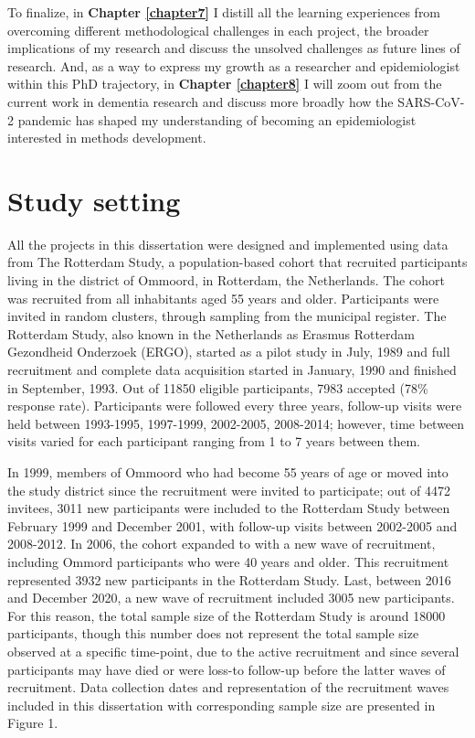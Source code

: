 \documentclass[
]{book}
\begin{document}
To finalize, in \textbf{Chapter \ref{chapter7}} I distill all the learning experiences from overcoming different methodological challenges in each project, the broader implications of my research and discuss the unsolved challenges as future lines of research. And, as a way to express my growth as a researcher and epidemiologist within this PhD trajectory, in \textbf{Chapter \ref{chapter8}} I will zoom out from the current work in dementia research and discuss more broadly how the SARS-CoV-2 pandemic has shaped my understanding of becoming an epidemiologist interested in methods development.

\newpage

\hypertarget{study-setting}{%
\section{Study setting}\label{study-setting}}

All the projects in this dissertation were designed and implemented using data from The Rotterdam Study, a population-based cohort that recruited participants living in the district of Ommoord, in Rotterdam, the Netherlands. The cohort was recruited from all inhabitants aged 55 years and older. Participants were invited in random clusters, through sampling from the municipal register\autocite{hofman1991}. The Rotterdam Study, also known in the Netherlands as Erasmus Rotterdam Gezondheid Onderzoek (ERGO), started as a pilot study in July, 1989 and full recruitment and complete data acquisition started in January, 1990 and finished in September, 1993. Out of 11850 eligible participants, 7983 accepted (78\% response rate). Participants were followed every three years, follow-up visits were held between 1993-1995, 1997-1999, 2002-2005, 2008-2014; however, time between visits varied for each participant ranging from 1 to 7 years between them.

In 1999, members of Ommoord who had become 55 years of age or moved into the study district since the recruitment were invited to participate; out of 4472 invitees, 3011 new participants were included to the Rotterdam Study \autocite{hofman2007} between February 1999 and December 2001, with follow-up visits between 2002-2005 and 2008-2012. In 2006, the cohort expanded to with a new wave of recruitment, including Ommord participants who were 40 years and older. This recruitment represented 3932 new participants in the Rotterdam Study. Last, between 2016 and December 2020, a new wave of recruitment included 3005 new participants. For this reason, the total sample size of the Rotterdam Study is around 18000 participants, though this number does not represent the total sample size observed at a specific time-point, due to the active recruitment and since several participants may have died or were loss-to follow-up before the latter waves of recruitment. Data collection dates and representation of the recruitment waves included in this dissertation with corresponding sample size are presented in Figure 1.
\end{document}

